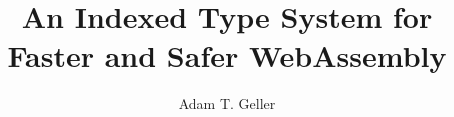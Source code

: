 \documentclass[gpscopy,onehalfspacing,11pt]{ubcdiss}
\author{Adam T. Geller}
\title{An Indexed Type System for Faster and Safer WebAssembly}
\theoremstyle{definition}
\begin{document}
\maketitle

\makecommitteepage


\cleardoublepage


\cleardoublepage


\cleardoublepage

\tableofcontents                %
\cleardoublepage

\listoffigures                  %
\cleardoublepage


\cleardoublepage


\cleardoublepage

\mainmatter

\raggedbottom









\begin{singlespace}
    \raggedright
    
    
\end{singlespace}

\appendix


\end{document}
